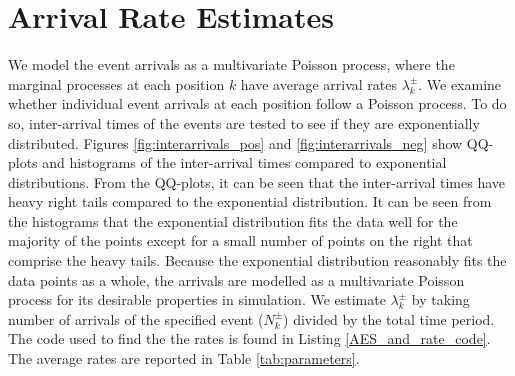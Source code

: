 \section{Arrival Rate Estimates}\label{ch:poisson}
We model the event arrivals as a multivariate Poisson process, where the marginal processes at each position $k$ have average arrival rates $\lambda^{\pm}_k$. We examine whether individual event arrivals at each position follow a Poisson process. To do so, inter-arrival times of the events are tested to see if they are exponentially distributed. Figures \ref{fig:interarrivals_pos} and \ref{fig:interarrivals_neg} show QQ-plots and histograms of the inter-arrival times compared to exponential distributions. From the QQ-plots, it can be seen that the inter-arrival times have heavy right tails compared to the exponential distribution. It can be seen from the histograms that the exponential distribution fits the data well for the majority of the points except for a small number of points on the right that comprise the heavy tails. Because the exponential distribution reasonably fits the data points as a whole, the arrivals are modelled as a multivariate Poisson process for its desirable properties in simulation. We estimate $\lambda^{\pm}_k$ by taking number of arrivals of the specified event ($N^{\pm}_k$) divided by the total time period. The code used to find the the rates is found in Listing \ref{AES_and_rate_code}. The average rates are reported in Table \ref{tab:parameters}.

